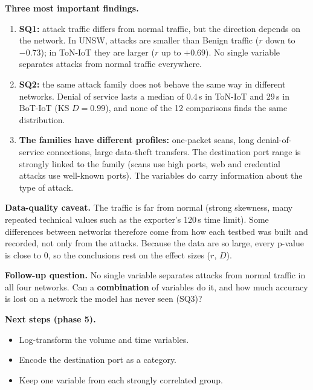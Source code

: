 \documentclass[11pt,a4paper]{article}
\begin{document}
\textbf{Three most important findings.}
\begin{enumerate}
  \item \textbf{SQ1:} attack traffic differs from normal traffic, but the direction depends on the network. In UNSW,
        attacks are smaller than Benign traffic ($r$ down to $-0.73$); in ToN-IoT they are larger ($r$ up to $+0.69$).
        No single variable separates attacks from normal traffic everywhere.
  \item \textbf{SQ2:} the same attack family does not behave the same way in different networks. Denial of service
        lasts a median of 0.4\,s in ToN-IoT and 29\,s in BoT-IoT (KS $D = 0.99$), and none of the 12 comparisons finds
        the same distribution.
  \item \textbf{The families have different profiles:} one-packet scans, long denial-of-service connections, large
        data-theft transfers. The destination port range is strongly linked to the family (scans use high ports, web
        and credential attacks use well-known ports). The variables do carry information about the type of attack.
\end{enumerate}

\textbf{Data-quality caveat.} The traffic is far from normal (strong skewness, many repeated technical values such as
the exporter's 120\,s time limit). Some differences between networks therefore come from how each testbed was built
and recorded, not only from the attacks. Because the data are so large, every p-value is close to 0, so the
conclusions rest on the effect sizes ($r$, $D$).

\textbf{Follow-up question.} No single variable separates attacks from normal traffic in all four networks. Can a
\textbf{combination} of variables do it, and how much accuracy is lost on a network the model has never seen (SQ3)?

\textbf{Next steps (phase 5).}
\begin{itemize}
  \item Log-transform the volume and time variables.
  \item Encode the destination port as a category.
  \item Keep one variable from each strongly correlated group.
\end{itemize}
\end{document}
